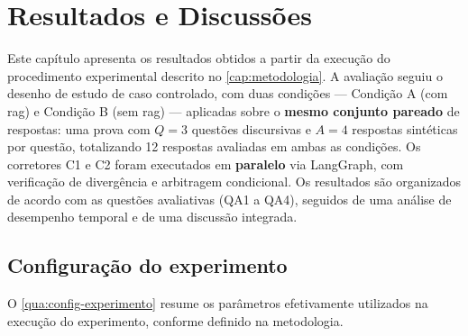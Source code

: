 \chapter{Resultados e Discussões}
\label{cap:resultados}

Este capítulo apresenta os resultados obtidos a partir da execução do procedimento experimental descrito no \autoref{cap:metodologia}. A avaliação seguiu o desenho de estudo de caso controlado, com duas condições --- Condição A (com \gls{rag}) e Condição B (sem \gls{rag}) --- aplicadas sobre o \textbf{mesmo conjunto pareado} de respostas: uma prova com $Q=3$ questões discursivas e $A=4$ respostas sintéticas por questão, totalizando 12 respostas avaliadas em ambas as condições. Os corretores C1 e C2 foram executados em \textbf{paralelo} via LangGraph, com verificação de divergência e arbitragem condicional. Os resultados são organizados de acordo com as questões avaliativas (QA1 a QA4), seguidos de uma análise de desempenho temporal e de uma discussão integrada.

\section{Configuração do experimento}

O \autoref{qua:config-experimento} resume os parâmetros efetivamente utilizados na execução do experimento, conforme definido na metodologia.

